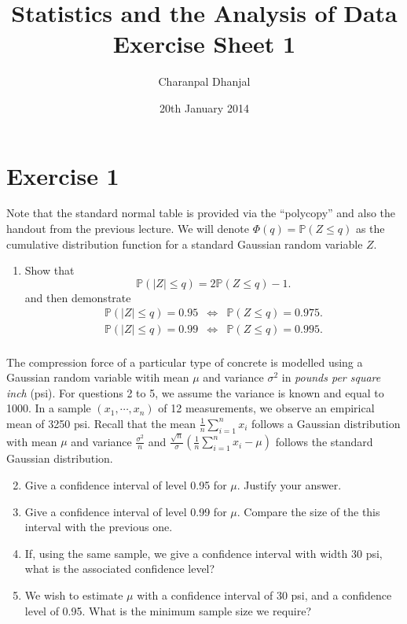 \documentclass[a4paper,10pt]{article}
\title{Statistics and the Analysis of Data\\ Exercise Sheet 1}
\author{Charanpal Dhanjal}
\begin{document}
\date{20th January 2014}
\maketitle

\section*{Exercise 1}

Note that the standard normal table is provided via the ``polycopy'' and also the handout from the previous lecture. We will denote $\Phi(q)= \mathbb{P}(Z\le q)$ as the cumulative distribution function for a standard Gaussian random variable $Z$. 

\begin{enumerate} 
 

\item  Show that
\begin{equation}\label{eq:quantile}
\mathbb{P} (|Z|\le q) = 2 \mathbb{P} (Z\le q) -1.
\end{equation}
and then demonstrate
\begin{eqnarray*}
\mathbb{P}(|Z|\le q ) = 0.95 &\Leftrightarrow & \mathbb{P} ( Z\le q) = 0.975.\\
\mathbb{P}(|Z|\le q ) = 0.99 &\Leftrightarrow & \mathbb{P} ( Z\le q) = 0.995.\\
\end{eqnarray*}
\end{enumerate}

The compression force of a particular type of concrete is modelled using a Gaussian random variable witih mean $\mu$ and variance $\sigma^2$ in \emph{pounds per square inch} (psi). For questions 2 to 5, we assume the variance is known and equal to 1000. In a sample $(x_1,\cdots, x_n)$ of 12 measurements, we observe an empirical mean of 3250 psi. Recall that the mean $\frac 1n \sum_{i=1}^n x_i$ follows a Gaussian distribution with mean $\mu$ and variance $\frac{\sigma^2}n$ and $\frac{\sqrt{n}}{\sigma} \left( \frac 1n \sum_{i=1}^n x_i - \mu\right)$ follows the standard Gaussian distribution. 

\begin{enumerate}
\setcounter{enumi}{1}
\item Give a confidence interval of level 0.95 for $\mu$. Justify your answer. 
\item Give a confidence interval of level 0.99 for $\mu$. Compare the size of the this interval with the previous one. 
\item If, using the same sample, we give a confidence interval with width 30 psi, what is the associated confidence level? 
\item We wish to estimate $\mu$ with a confidence interval of 30 psi, and a confidence level of 0.95. What is the minimum sample size we require? 
\end{enumerate}
\end{document}
